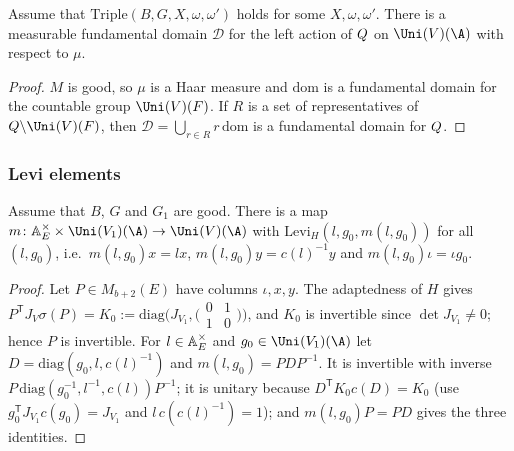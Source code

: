 \begin{lemma}\label{pf:thmK-cone:fdQ}
Assume that $\mathrm{Triple}(B,G,X,\omega,\omega')$ holds for some $X,\omega,\omega'$.  There is a measurable
fundamental domain $\mathcal D$ for the left action of $Q$ on $\Uni(V)(\A)$ with respect to $\mu$.
\end{lemma}

\begin{proof}
$M$ is good, so $\mu$ is a Haar measure and $\mathrm{dom}$ is a fundamental domain for the countable group
$\Uni(V)(F)$.  If $R$ is a set of representatives of $\thmKconeStab\backslash\Uni(V)(F)$, then
$\mathcal D=\bigcup_{r\in R}r\,\mathrm{dom}$ is a fundamental domain for $Q$.
\end{proof}

\subsubsection{Levi elements}

\begin{lemma}\label{pf:thmK-cone:leviV}
Assume that $B$, $G$ and $G_1$ are good.  There is a map $m\colon\thmKconeAE^\times\times\Uni(V_1)(\A)\to\Uni(V)(\A)$
with $\mathrm{Levi}_H(l,g_0,m(l,g_0))$ for all $(l,g_0)$, i.e.\ $m(l,g_0)x=lx$, $m(l,g_0)y=c(l)^{-1}y$ and
$m(l,g_0)\iota=\iota g_0$.
\end{lemma}

\begin{proof}
Let $P\in M_{b+2}(E)$ have columns $\iota,x,y$.  The adaptedness of $H$ gives
$P^{\mathsf T}J_V\sigma(P)=K_0:=\mathrm{diag}\bigl(J_{V_1},\bigl(\begin{smallmatrix}0&1\\1&0\end{smallmatrix}\bigr)\bigr)$,
and $K_0$ is invertible since $\det J_{V_1}\neq0$; hence $P$ is invertible.  For $l\in\mathbb{A}_E^\times$ and
$g_0\in\Uni(V_1)(\A)$ let $D=\mathrm{diag}(g_0,l,c(l)^{-1})$ and $m(l,g_0)=PDP^{-1}$.  It is invertible with inverse
$P\,\mathrm{diag}(g_0^{-1},l^{-1},c(l))P^{-1}$; it is unitary because $D^{\mathsf T}K_0c(D)=K_0$ (use
$g_0^{\mathsf T}J_{V_1}c(g_0)=J_{V_1}$ and $l\,c(c(l)^{-1})=1$); and $m(l,g_0)P=PD$ gives the three identities.
\end{proof}

